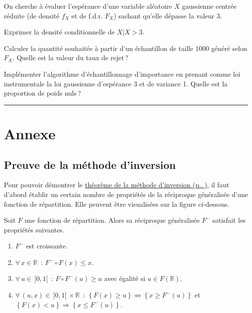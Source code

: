 On cherche à évaluer l'espérance d'une variable aléatoire \(X\)
gaussienne centrée réduite (de densité \(f_X\) et de f.d.r. \(F_X\))
sachant qu'elle dépasse la valeur 3.

\label{V-echimp1}
Exprimer la densité conditionnelle de
\(X|X>3\).

\label{V-echimp2}
Calculer la quantité souhaitée à partir d'un échantillon de taille 1000
généré selon \(F_X\). Quelle est la valeur du taux de
rejet\,?

\label{V-echimp3}
Implémenter l'algorithme d'échantillonnage d'importance en prenant comme
loi instrumentale la loi gaussienne d'espérance 3 et de variance 1.
Quelle est la proportion de poids nuls\,?

\begin{center}\rule{0.5\linewidth}{0.5pt}\end{center}



\chapter{Annexe}\label{V-annexe}

\section{Preuve de la méthode
d'inversion}\label{V-preuve-de-la-muxe9thode-dinversion}

Pour pouvoir démontrer le \protect\hyperref[V-invgen]{théorème de la
méthode d'inversion (p.~\pageref*{V-invgen})}, il faut d'abord établir
un certain nombre de propriétés de la réciproque généralisée d'une
fonction de répartition. Elle peuvent être visualisées sur la figure
ci-dessous.

\begin{proposition}\label{V-proprecgen}
Soit \(F\) une fonction de répartition. Alors sa réciproque généralisée
\(F^-\) satisfait les propriétés suivantes.

\begin{enumerate}
\def\labelenumi{\arabic{enumi}.}
\item
  \(F^-\) est croissante.
\item
  \(\forall\, x \in \mathbb{R}\)~: \(F^- \circ F (x) \leq x\).
\item
  \(\forall\, u \in\, ]0,1[\)~: \(F \circ F^-(u) \geq u\) avec égalité
  si \(u \in F(\mathbb{R})\).
\item
  \(\forall\, (u,x) \in\, ]0,1[\, \times \mathbb{R}\)~:
  \(\left\{F(x) \geq u\right\} \Leftrightarrow \left\{x \geq F^-(u)\right\}\)
  et
  \(\left\{F(x) < u\right\} \Rightarrow \left\{x \leq F^-(u)\right\}\).
\end{enumerate}
\end{proposition}


